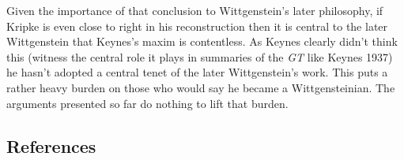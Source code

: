 \documentclass[
  10pt,
  letterpaper,
  DIV=11,
  numbers=noendperiod,
  twoside]{scrartcl}
\begin{document}
Given the importance of that conclusion to Wittgenstein's later
philosophy, if Kripke is even close to right in his reconstruction then
it is central to the later Wittgenstein that Keynes's maxim is
contentless. As Keynes clearly didn't think this (witness the central
role it plays in summaries of the \emph{GT} like Keynes 1937) he hasn't
adopted a central tenet of the later Wittgenstein's work. This puts a
rather heavy burden on those who would say he became a Wittgensteinian.
The arguments presented so far do nothing to lift that burden.

\subsection*{References}\label{references}
\end{document}

